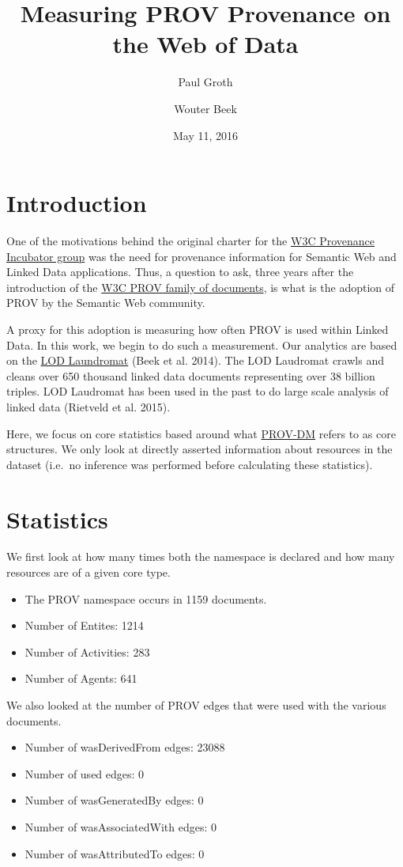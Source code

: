 \documentclass[11pt]{article}
\title{Measuring PROV Provenance on the Web of Data}
\author{Paul Groth}
\affil{Elsevier Labs}
\author{Wouter Beek}
\affil{Vrije Universiteit Amsterdam}
\date{May 11, 2016}
\begin{document}
    
    
    \maketitle

\section{Introduction}
One of the motivations behind the original charter for the
\href{https://www.w3.org/2005/Incubator/prov/charter}{W3C Provenance
Incubator group} was the need for provenance information for Semantic
Web and Linked Data applications. Thus, a question to ask, three years
after the introduction of the
\href{https://www.w3.org/TR/prov-overview/}{W3C PROV family of
documents}, is what is the adoption of PROV by the Semantic Web
community.

A proxy for this adoption is measuring how often PROV is used within
Linked Data. In this work, we begin to do such a measurement. Our
analytics are based on the \href{http://lodlaundromat.org/}{LOD
Laundromat} (Beek et al. 2014). The LOD Laudromat crawls and cleans over
650 thousand linked data documents representing over 38 billion triples.
LOD Laudromat has been used in the past to do large scale analysis of
linked data (Rietveld et al. 2015).

Here, we focus on core statistics based around what
\href{http://www.w3.org/TR/prov-dm/}{PROV-DM} refers to as core
structures. We only look at directly asserted information about
resources in the dataset (i.e.~no inference was performed before
calculating these statistics).


\section{Statistics}\label{statistics}

We first look at how many times both the namespace is declared and how
many resources are of a given core type.
\begin{itemize}
\item The PROV namespace occurs in 1159 documents.
\item Number of Entites: 1214
\item Number of Activities: 283
\item Number of Agents: 641
\end{itemize}

We also looked at the number of PROV edges that were used with the
various documents. 
\begin{itemize}
\item Number of wasDerivedFrom edges: 23088 
\item Number of used edges: 0 
\item Number of wasGeneratedBy edges: 0 
\item Number of wasAssociatedWith edges: 0 
\item Number of wasAttributedTo edges: 0
\end{itemize}
\end{document}
